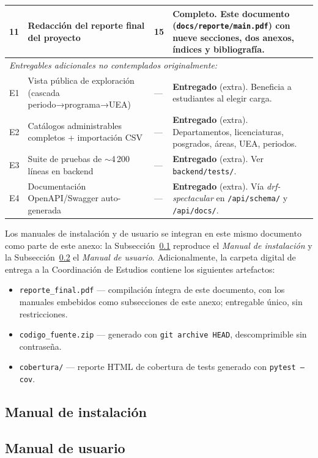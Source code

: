 \begin{longtable}{p{} p{} p{} p{}}
    \midrule
    11 & Redacción del reporte final del proyecto & 15 & \textbf{Completo}. Este documento (\texttt{docs/reporte/main.pdf}) con nueve secciones, dos anexos, índices y bibliografía. \\
    \midrule
    \multicolumn{4}{l}{\emph{Entregables adicionales no contemplados originalmente:}} \\
    \midrule
    E1 & Vista pública de exploración (cascada periodo→programa→UEA) & --- & \textbf{Entregado} (extra). Beneficia a estudiantes al elegir carga. \\
    \midrule
    E2 & Catálogos administrables completos + importación CSV & --- & \textbf{Entregado} (extra). Departamentos, licenciaturas, posgrados, áreas, UEA, periodos. \\
    \midrule
    E3 & Suite de pruebas de $\sim$4\,200 líneas en backend & --- & \textbf{Entregado} (extra). Ver \texttt{backend/tests/}. \\
    \midrule
    E4 & Documentación OpenAPI/Swagger auto-generada & --- & \textbf{Entregado} (extra). Vía \emph{drf-spectacular} en \texttt{/api/schema/} y \texttt{/api/docs/}. \\
    \bottomrule
\end{longtable}

Los manuales de instalación y de usuario se integran en este mismo documento como parte de este anexo: la Subsección~\ref{apx:manual-instalacion} reproduce el \emph{Manual de instalación} y la Subsección~\ref{apx:manual-usuario} el \emph{Manual de usuario}. Adicionalmente, la carpeta digital de entrega a la Coordinación de Estudios contiene los siguientes artefactos:

\begin{itemize}
    \item \texttt{reporte\_final.pdf} --- compilación íntegra de este documento, con los manuales embebidos como subsecciones de este anexo; entregable único, sin restricciones.
    \item \texttt{codigo\_fuente.zip} --- generado con \texttt{git archive HEAD}, descomprimible sin contraseña.
    \item \texttt{cobertura/} --- reporte HTML de cobertura de tests generado con \texttt{pytest --cov}.
\end{itemize}

\subsection{Manual de instalación}\label{apx:manual-instalacion}


\subsection{Manual de usuario}\label{apx:manual-usuario}


\newpage
